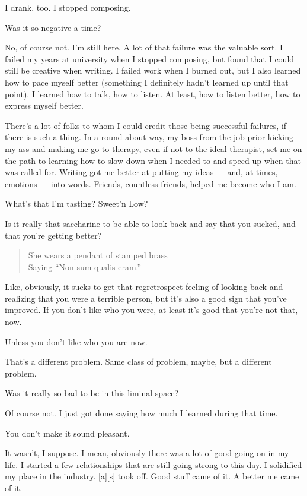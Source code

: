 \begin{paracol}{2}
\begin{leftcolumn}
I drank, too. I stopped composing.

\begin{ally}
Was it so negative a time?
\end{ally}
No, of course not. I'm still here. A lot of that failure was the valuable sort. I failed my years at university when I stopped composing, but found that I could still be creative when writing. I failed work when I burned out, but I also learned how to pace myself better (something I definitely hadn't learned up until that point). I learned how to talk, how to listen. At least, how to listen better, how to express myself better.

There's a lot of folks to whom I could credit those being successful failures, if there is such a thing. In a round about way, my boss from the job prior kicking my ass and making me go to therapy, even if not to the ideal therapist, set me on the path to learning how to slow down when I needed to and speed up when that was called for. Writing got me better at putting my ideas --- and, at times, emotions --- into words. Friends, countless friends, helped me become who I am.

\begin{ally}
What's that I'm tasting? Sweet'n Low?
\end{ally}
Is it really that saccharine to be able to look back and say that you sucked, and that you're getting better?

\begin{verse}
She wears a pendant of stamped brass\\
\vin Saying ``Non sum qualis eram.''
\end{verse}

Like, obviously, it sucks to get that regretrospect feeling of looking back and realizing that you were a terrible person, but it's also a good sign that you've improved. If you don't like who you were, at least it's good that you're not that, now.

\begin{ally}
Unless you don't like who you are now.
\end{ally}
That's a different problem. Same class of problem, maybe, but a different problem.
\newpage

\begin{ally}
Was it really so bad to be in this liminal space?
\end{ally}
Of course not. I just got done saying how much I learned during that time.

\begin{ally}
You don't make it sound pleasant.
\end{ally}
It wasn't, I suppose. I mean, obviously there was a lot of good going on in my life. I started a few relationships that are still going strong to this day. I solidified my place in the industry. {[}a{]}{[}s{]} took off. Good stuff came of it. A better me came of it.


\end{leftcolumn}
\end{paracol}
